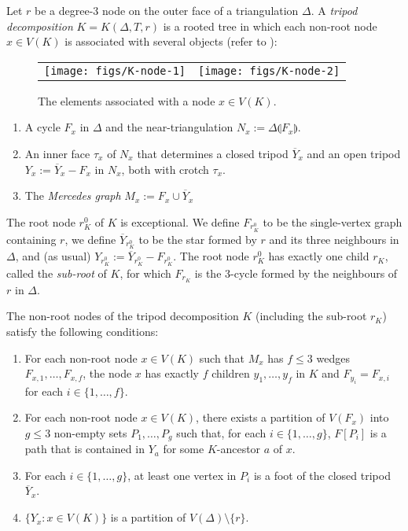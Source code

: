 \documentclass{patmorin}
\renewcommand{\proplabel}[1]{\label{prop:#1}}
\begin{document}
Let $r$ be a degree-3 node on the outer face of a triangulation $\Delta$.  A \emph{tripod decomposition}  $K=K(\Delta, T, r)$ is a rooted tree in which each non-root node $x\in V(K)$ is associated with several objects (refer to ):

\begin{figure}
  \begin{center}
    \begin{tabular}{cc}
      \texttt{[image: figs/K-node-1]} &
      \texttt{[image: figs/K-node-2]}
    \end{tabular}
  \end{center}
  \caption{The elements associated with a node $x\in V(K)$.}
\end{figure}

\begin{enumerate}
  \item A cycle $F_x$ in $\Delta$ and the near-triangulation $N_x:=\Delta\llparenthesis F_x\rrparenthesis$.
  
  \item An inner face $\tau_x$ of $N_x$ that determines a closed tripod $\overline{Y}_x$ and an open tripod $Y_x:=\overline{Y}_x-F_x$ in $N_x$, both with crotch $\tau_x$.
  
  \item The \emph{Mercedes graph} $M_x:=F_x\cup \overline{Y}_x$
\end{enumerate}

The root node $r^0_K$ of $K$ is exceptional.  We define $F_{r^0_K}$ to be the single-vertex graph containing $r$, we define $\overline{Y}_{r^0_K}$ to be the star formed by $r$ and its three neighbours in $\Delta$, and (as usual) $Y_{r^0_K}:=\overline{Y}_{r^0_K}-F_{r^0_K}$.  The root node $r^0_K$ has exactly one child $r_K$, called the \emph{sub-root} of $K$, for which $F_{r_K}$ is the 3-cycle formed by the neighbours of $r$ in $\Delta$.

The non-root nodes of the tripod decomposition $K$ (including the sub-root $r_K$) satisfy the following conditions:
\begin{enumerate}[(PR1)]
  \item \proplabel{children} For each non-root node $x\in V(K)$ such that $M_x$ has $f\le 3$ wedges $F_{x,1},\ldots,F_{x,f}$, the node $x$ has exactly $f$ children $y_1,\ldots,y_f$ in $K$ and $F_{y_i} = F_{x,i}$ for each $i\in\{1,\ldots,f\}$.
  
  \item \proplabel{ancestor-boundary} For each non-root node $x\in V(K)$, there exists a partition of $V(F_x)$ into $g\le 3$ non-empty sets $P_1,\ldots,P_g$ such that, for each $i\in\{1,\ldots,g\}$, $F[P_i]$ is a path that is contained in $Y_a$ for some $K$-ancestor $a$ of $x$. 
  
  \item \proplabel{tripod-feet} For each $i\in\{1,\ldots,g\}$, at least one vertex in $P_i$ is a foot of the closed tripod $\overline{Y}_x$.

  \item \proplabel{partition} $\{Y_x : x\in V(K)\}$ is a partition of $V(\Delta)\setminus\{r\}$.
\end{enumerate}
\end{document}
